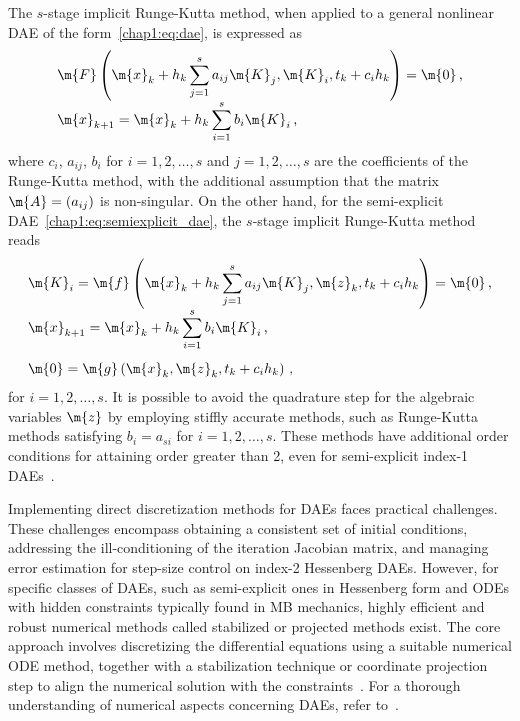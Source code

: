 The $s$-stage implicit Runge-Kutta method, when applied to a general nonlinear \ac{DAE} of the form~\eqref{chap1:eq:dae}, is expressed as
%
\begin{equation*}
  \begin{array}{l}
    \m{F}\left(\m{x}_{k} + h_k\displaystyle\sum_{j=1}^{s}a_{ij} \m{K}_j, \m{K}_i, t_{k} + c_i h_k\right) = \m{0} \, \text{,} \\[1em]
    \m{x}_{k+1} = \m{x}_{k} + h_k\displaystyle\sum_{i=1}^{s} b_i \m{K}_i \, \text{,}
  \end{array}
\end{equation*}
%
where $c_i$, $a_{ij}$, $b_i$ for $i = 1, 2, \dots, s$ and $j = 1, 2, \dots, s$ are the coefficients of the Runge-Kutta method, with the additional assumption that the matrix $\m{A} = (a_{ij})$ is non-singular. On the other hand, for the semi-explicit \ac{DAE}~\eqref{chap1:eq:semiexplicit_dae}, the $s$-stage implicit Runge-Kutta method reads
%
\begin{equation*}
  \begin{array}{l}
    \m{K}_i = \m{f}\left(\m{x}_{k} + h_k\displaystyle\sum_{j=1}^{s}a_{ij} \m{K}_j, \m{z}_{k}, t_{k} + c_i h_k\right) = \m{0} \, \text{,} \\[1em]
    \m{x}_{k+1} = \m{x}_{k} + h_k\displaystyle\sum_{i=1}^{s} b_i \m{K}_i \, \text{,} \\[1.75em]
    \m{0} = \m{g}\left(\m{x}_{k}, \m{z}_{k}, t_{k} + c_i h_k\right) \, \text{,}
  \end{array}
\end{equation*}
%
for $i = 1, 2, \dots, s$. It is possible to avoid the quadrature step for the algebraic variables $\m{z}$ by employing stiffly accurate methods, such as Runge-Kutta methods satisfying $b_i = a_{si}$ for $i = 1, 2, \dots, s$. These methods have additional order conditions for attaining order greater than 2, even for semi-explicit index-1 \acp{DAE}~\cite{brenan1995numerical}.

\vspace{1.0em}

Implementing direct discretization methods for \acp{DAE} faces practical challenges. These challenges encompass obtaining a consistent set of initial conditions, addressing the ill-conditioning of the iteration Jacobian matrix, and managing error estimation for step-size control on index-2 Hessenberg \acp{DAE}. However, for specific classes of \acp{DAE}, such as semi-explicit ones in Hessenberg form and \acp{ODE} with hidden constraints typically found in \ac{MB} mechanics, highly efficient and robust numerical methods called stabilized or projected methods exist. The core approach involves discretizing the differential equations using a suitable numerical \ac{ODE} method, together with a stabilization technique or coordinate projection step to align the numerical solution with the constraints~\cite{eichsoellner1998numerical}. For a thorough understanding of numerical aspects concerning \acp{DAE}, refer to~\cite{ascher1998computer, brenan1995numerical, hairer1999stiff}.

